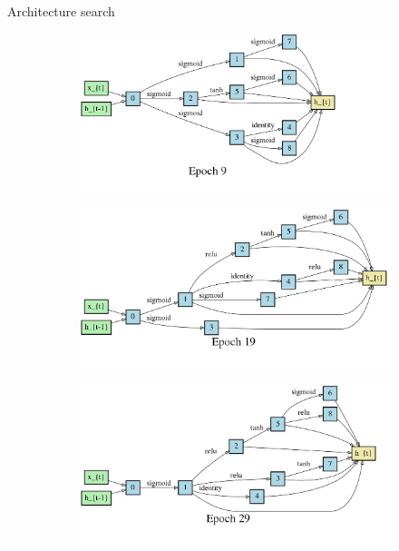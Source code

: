 \documentclass{beamer}
\begin{document}
\begin{frame}{Architecture search}
    \begin{figure}
      \begin{center}
        \begin{subfigure}[t]{.45\linewidth}
          \centering
          \includegraphics[width=0.99\linewidth]{figures/darts_progress_recurrent-9.png}
        \end{subfigure}
        \begin{subfigure}[t]{.45\linewidth}
          \centering
          \includegraphics[width=0.99\linewidth]{figures/darts_progress_recurrent-19.png}
        \end{subfigure}
        \begin{subfigure}[t]{.45\linewidth}
          \centering
          \includegraphics[width=0.99\linewidth]{figures/darts_progress_recurrent-29.png}

\end{subfigure}
\end{center}
\end{figure}
\end{frame}
\end{document}
